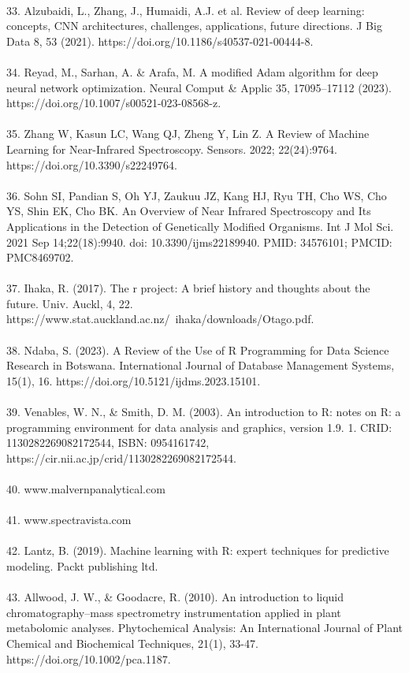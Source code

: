 \documentclass[12pt,a4paper]{report}
\begin{document}
\\
33. Alzubaidi, L., Zhang, J., Humaidi, A.J. et al. Review of deep learning: concepts, CNN architectures, challenges, applications, future directions. J Big Data 8, 53 (2021). https://doi.org/10.1186/s40537-021-00444-8. \\
\\
34. Reyad, M., Sarhan, A. \& Arafa, M. A modified Adam algorithm for deep neural network optimization. Neural Comput \& Applic 35, 17095–17112 (2023). https://doi.org/10.1007/s00521-023-08568-z.\\
\\
35. Zhang W, Kasun LC, Wang QJ, Zheng Y, Lin Z. A Review of Machine Learning for Near-Infrared Spectroscopy. Sensors. 2022; 22(24):9764. https://doi.org/10.3390/s22249764. \\
\\
36. Sohn SI, Pandian S, Oh YJ, Zaukuu JZ, Kang HJ, Ryu TH, Cho WS, Cho YS, Shin EK, Cho BK. An Overview of Near Infrared Spectroscopy and Its Applications in the Detection of Genetically Modified Organisms. Int J Mol Sci. 2021 Sep 14;22(18):9940. doi: 10.3390/ijms22189940. PMID: 34576101; PMCID: PMC8469702.\\
\\
37. Ihaka, R. (2017). The r project: A brief history and thoughts about the future. Univ. Auckl, 4, 22. https://www.stat.auckland.ac.nz/~ihaka/downloads/Otago.pdf. \\
\\
38. Ndaba, S. (2023). A Review of the Use of R Programming for Data Science Research in Botswana. International Journal of Database Management Systems, 15(1), 16. https://doi.org/10.5121/ijdms.2023.15101. \\
\\
39. Venables, W. N., \& Smith, D. M. (2003). An introduction to R: notes on R: a programming environment for data analysis and graphics, version 1.9. 1. CRID: 1130282269082172544, ISBN: 0954161742, https://cir.nii.ac.jp/crid/1130282269082172544. \\
\\
40. www.malvernpanalytical.com \\
\\
41. www.spectravista.com \\
\\
42. Lantz, B. (2019). Machine learning with R: expert techniques for predictive modeling. Packt publishing ltd. \\
\\
43. Allwood, J. W., \& Goodacre, R. (2010). An introduction to liquid chromatography–mass spectrometry instrumentation applied in plant metabolomic analyses. Phytochemical Analysis: An International Journal of Plant Chemical and Biochemical Techniques, 21(1), 33-47. https://doi.org/10.1002/pca.1187. \\
\end{document}
